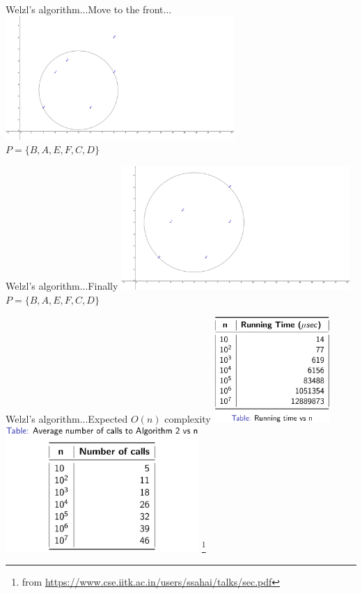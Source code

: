\documentclass{beamer}
\newcommand\blfootnote[1]{%
  \begingroup
  \renewcommand\thefootnote{}\footnote{#1}%
  \addtocounter{footnote}{-1}%
  \endgroup
}
\begin{document}
\begin{frame}{Welzl's algorithm...}{Move to the front...}
    \centering
    \includegraphics[trim=0 0 7cm 0,clip,width=0.65\textwidth]{figures/SEC10} \\
    $P = \{B, A, E, F, C, D\}$
\end{frame}
\begin{frame}{Welzl's algorithm...}{Finally}
    \centering
    \includegraphics[trim=0 0 7cm 0,clip,width=0.65\textwidth]{figures/SEC11} \\
    $P = \{B, A, E, F, C, D\}$
\end{frame}
\begin{frame}{Welzl's algorithm...}{Expected $O(n)$ complexity }
    \centering
    \includegraphics[width=0.33\textwidth]{figures/welzl1} 
    \includegraphics[width=0.55\textwidth]{figures/welzl2} 
    \blfootnote{\tiny{from \url{https://www.cse.iitk.ac.in/users/ssahai/talks/sec.pdf}}}
\end{frame}
\end{document}
